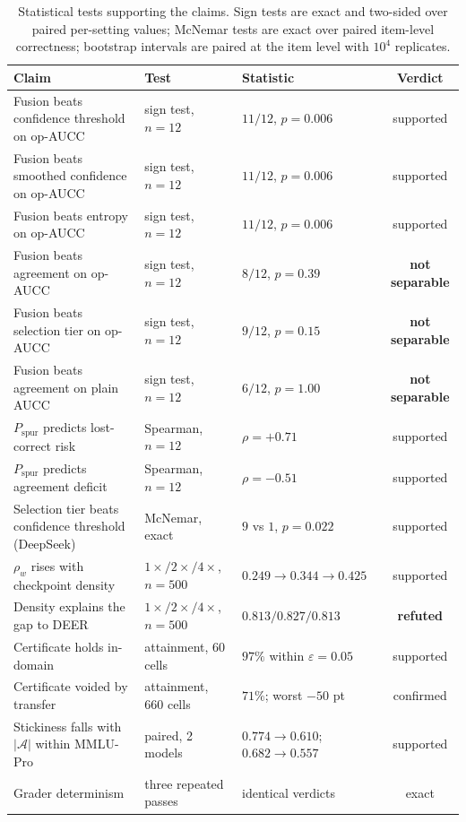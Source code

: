 \documentclass[acmsmall]{acmart}
\theoremstyle{acmdefinition}%
\theoremstyle{acmplain}}{}%
\begin{document}
\begin{table}[t]
\caption{Statistical tests supporting the claims. Sign tests are exact and two-sided over paired per-setting values; McNemar tests are exact over paired item-level correctness; bootstrap intervals are paired at the item level with $10^4$ replicates.}
\label{tab:stats}
\small
\setlength{\tabcolsep}{4pt}
\begin{tabular}{@{}L{4.35cm}L{2.95cm}L{2.45cm}c@{}}
\toprule
\textbf{Claim} & \textbf{Test} & \textbf{Statistic} & \textbf{Verdict} \\
\midrule
Fusion beats confidence threshold on op-AUCC & sign test, $n=12$ & $11/12$, $p=0.006$ & supported \\
Fusion beats smoothed confidence on op-AUCC & sign test, $n=12$ & $11/12$, $p=0.006$ & supported \\
Fusion beats entropy on op-AUCC & sign test, $n=12$ & $11/12$, $p=0.006$ & supported \\
Fusion beats agreement on op-AUCC & sign test, $n=12$ & $8/12$, $p=0.39$ & \textbf{not separable} \\
Fusion beats selection tier on op-AUCC & sign test, $n=12$ & $9/12$, $p=0.15$ & \textbf{not separable} \\
Fusion beats agreement on plain AUCC & sign test, $n=12$ & $6/12$, $p=1.00$ & \textbf{not separable} \\
$P_{\mathrm{spur}}$ predicts lost-correct risk & Spearman, $n=12$ & $\rho=+0.71$ & supported \\
$P_{\mathrm{spur}}$ predicts agreement deficit & Spearman, $n=12$ & $\rho=-0.51$ & supported \\
Selection tier beats confidence threshold (DeepSeek) & McNemar, exact & $9$ vs $1$, $p=0.022$ & supported \\
$\rho_w$ rises with checkpoint density & $1\times/2\times/4\times$, $n{=}500$ & $0.249\to0.344\to0.425$ & supported \\
Density explains the gap to DEER & $1\times/2\times/4\times$, $n{=}500$ & $0.813/0.827/0.813$ & \textbf{refuted} \\
Certificate holds in-domain & attainment, $60$ cells & $97\%$ within $\varepsilon{=}0.05$ & supported \\
Certificate voided by transfer & attainment, $660$ cells & $71\%$; worst $-50$ pt & confirmed \\
Stickiness falls with $|\mathcal{A}|$ within MMLU-Pro & paired, 2 models & $0.774{\to}0.610$; $0.682{\to}0.557$ & supported \\
Grader determinism & three repeated passes & identical verdicts & exact \\
\bottomrule
\end{tabular}
\end{table}
\end{document}
